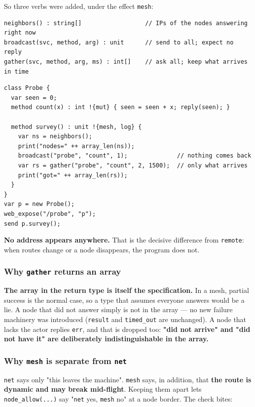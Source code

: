 \documentclass[11pt,a4paper]{article}
\begin{document}
So three verbs were added, under the effect \texttt{mesh}:

\begin{lstlisting}
neighbors() : string[]                  // IPs of the nodes answering right now
broadcast(svc, method, arg) : unit      // send to all; expect no reply
gather(svc, method, arg, ms) : int[]    // ask all; keep what arrives in time
\end{lstlisting}

\begin{lstlisting}
class Probe {
  var seen = 0;
  method count(x) : int !{mut} { seen = seen + x; reply(seen); }

  method survey() : unit !{mesh, log} {
    var ns = neighbors();
    print("nodes=" ++ array_len(ns));
    broadcast("probe", "count", 1);              // nothing comes back
    var rs = gather("probe", "count", 2, 1500);  // only what arrives
    print("got=" ++ array_len(rs));
  }
}
var p = new Probe();
web_expose("/probe", "p");
send p.survey();
\end{lstlisting}

\textbf{No address appears anywhere.} That is the decisive difference from
\texttt{remote}: when routes change or a node disappears, the program does not.

\subsubsection*{Why \texttt{gather} returns an array}

\textbf{The array in the return type is itself the specification.} In a mesh,
partial success is the normal case, so a type that assumes everyone answers
would be a lie. A node that did not answer simply is not in the array --- no
new failure machinery was introduced (\texttt{result} and \texttt{timed\_out}
are unchanged). A node that lacks the actor replies \texttt{err}, and that is
dropped too: \textbf{"did not arrive" and "did not have it" are deliberately
indistinguishable in the array.}

\subsubsection*{Why \texttt{mesh} is separate from \texttt{net}}

\texttt{net} says only "this leaves the machine". \texttt{mesh} says, in
addition, that \textbf{the route is dynamic and may break mid-flight}. Keeping
them apart lets \texttt{node\_allow(...)} say "\texttt{net} yes, \texttt{mesh}
no" at a node border. The check bites:
\end{document}
